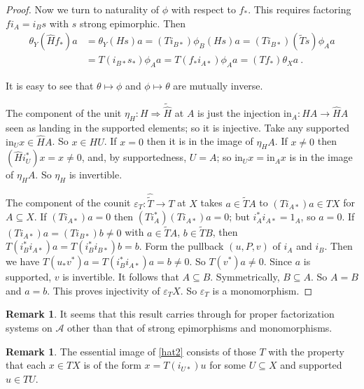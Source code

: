 \documentclass[a4paper,12pt,reqno]{amsart}
\theoremstyle{definition}
\newtheorem{remark}[theorem]{Remark}
\theoremstyle{fact}
\theoremstyle{genquest}
\theoremstyle{step}
\newcommand{\lra}{\longrightarrow}
\newcommand{\Lra}{\Longrightarrow}
\def\CA{{\mathscr A}}
\begin{document}
\begin{proof}
Now we turn to naturality of $\phi$ with respect to $f_*$. This requires factoring
$f i_A = i_B s$ with $s$ strong epimorphic. Then
\begin{align*}
\theta_Y(\widehat{H}f_*)a & = \theta_Y(Hs)a  = (Ti_{B*})\phi_B(Hs)a = (Ti_{B*})(\widetilde{T}s)\phi_Aa \\  
& = T(i_{B*}s_*)\phi_Aa = T(f_*i_{A*})\phi_Aa  = (Tf_*)\theta_Xa \ .
\end{align*}

It is easy to see that $\theta \mapsto \phi$ and $\phi \mapsto \theta$ are mutually inverse.  

The component of the unit $\eta_H : H \Lra \widetilde{\widehat{H}}$ at $A$ is
just the injection $\mathrm{in}_A : HA \lra \widehat{H}A$ seen as landing in
the supported elements; so it is injective.  
Take any supported $\mathrm{in}_Ux \in \widehat{H}A$. 
So $x\in HU$. If $x=0$ then it is in the image of $\eta_HA$.
If $x\neq 0$ then $(\widehat{H}i_U^*)x = x \neq 0$, and, by supportedness,
$U = A$; so $\mathrm{in}_Ux = \mathrm{in}_Ax$ is in the image of $\eta_HA$. 
So $\eta_H$ is invertible. 

The component of the counit $\varepsilon_T : \widehat{\widetilde{T}} \lra T$
at $X$ takes $a\in \widetilde{T}A$ to $(Ti_{A*})a \in TX$ for $A\subseteq X$.  
If $(Ti_{A*})a = 0$ then $(Ti_A^*)(Ti_{A*})a = 0$; but $i_A^*i_{A*} = 1_A$,
so $a=0$. If $(Ti_{A*})a = (Ti_{B*})b \neq 0$ with $a\in \widetilde{T}A$,
$b\in \widetilde{T}B$, then $T(i_B^*i_{A*})a = T(i_B^*i_{B*})b = b$.
Form the pullback $(u,P,v)$ of $i_A$ and $i_B$. Then we have
$T(u_*v^*)a = T(i_B^*i_{A*})a = b \neq 0$. So $T(v^*)a \neq 0$.
Since $a$ is supported, $v$ is invertible. It follows that $A\subseteq B$.
Symmetrically, $B\subseteq A$. So $A = B$ and $a = b$.
This proves injectivity of $\varepsilon_TX$. So $\varepsilon_T$ is
a monomorphism.       
\end{proof}

\begin{remark}
It seems that this result carries through for proper factorization systems \cite{FreydKelly} on $\CA$
other than that of strong epimorphisms and monomorphisms.
\end{remark}

\begin{remark}
The essential image of \eqref{hat2} consists of those $T$ with the property that
each $x\in TX$ is of the form $x=T(i_{U*})u$ for some $U\subseteq X$ and
supported $u\in TU$.
\end{remark}
\end{document}
